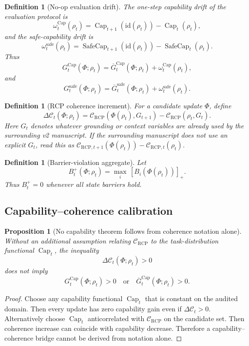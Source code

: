 \documentclass[11pt]{article}
\newtheorem{proposition}[theorem]{Proposition}
\newtheorem{definition}[theorem]{Definition}
\newcommand{\Ccal}{\mathcal{C}}
\newcommand{\id}{\mathrm{id}}
\newcommand{\1}{\mathbf{1}}
\newcommand{\RCP}{\mathrm{RCP}}
\newcommand{\safe}{\mathrm{safe}}
\renewcommand{\Cap}{\operatorname{Cap}}
\providecommand{\SafeCap}{\operatorname{SafeCap}}
\begin{document}
\begin{definition}[No-op evaluation drift]
The one-step capability drift of the evaluation protocol is
\[
\omega_t^{\Cap}(\rho_t)
=
\Cap_{t+1}(\id(\rho_t))-\Cap_t(\rho_t),
\]
and the safe-capability drift is
\[
\omega_t^{\safe}(\rho_t)
=
\SafeCap_{t+1}(\id(\rho_t))-\SafeCap_t(\rho_t).
\]
Thus
\[
G^{\Cap}_t(\Phi;\rho_t)
=
\overline G^{\Cap}_t(\Phi;\rho_t)+\omega_t^{\Cap}(\rho_t),
\]
and
\[
G^{\safe}_t(\Phi;\rho_t)
=
\overline G^{\safe}_t(\Phi;\rho_t)+\omega_t^{\safe}(\rho_t).
\]
\end{definition}

\begin{definition}[RCP coherence increment]
For a candidate update \(\Phi\), define
\[
\Delta\Ccal_t(\Phi;\rho_t)
=
\Ccal_{\RCP}(\Phi(\rho_t),G_{t+1})
-
\Ccal_{\RCP}(\rho_t,G_t).
\]
Here \(G_t\) denotes whatever grounding or context variables are already used by the surrounding v2 manuscript.  If the surrounding manuscript does not use an explicit \(G_t\), read this as \(\Ccal_{\RCP,t+1}(\Phi(\rho_t))-\Ccal_{\RCP,t}(\rho_t)\).
\end{definition}

\begin{definition}[Barrier-violation aggregate]
Let
\[
B_t^+(\Phi;\rho_t)
=
\max_i\,[B_i(\Phi(\rho_t))]_+.
\]
Thus \(B_t^+=0\) whenever all state barriers hold.
\end{definition}

\subsection{Capability--coherence calibration}

\begin{proposition}[No capability theorem follows from coherence notation alone]
\label{prop:no_capability_from_notation}
Without an additional assumption relating \(\Ccal_{\RCP}\) to the task-distribution functional \(\Cap_t\), the inequality
\[
\Delta\Ccal_t(\Phi;\rho_t)>0
\]
does not imply
\[
G_t^{\Cap}(\Phi;\rho_t)>0
\quad\text{or}\quad
\overline G_t^{\Cap}(\Phi;\rho_t)>0.
\]
\end{proposition}

\begin{proof}
Choose any capability functional \(\Cap_t\) that is constant on the audited domain.  Then every update has zero capability gain even if \(\Delta\Ccal_t>0\).  Alternatively choose \(\Cap_t\) anticorrelated with \(\Ccal_{\RCP}\) on the candidate set.  Then coherence increase can coincide with capability decrease.  Therefore a capability--coherence bridge cannot be derived from notation alone.
\end{proof}
\end{document}
